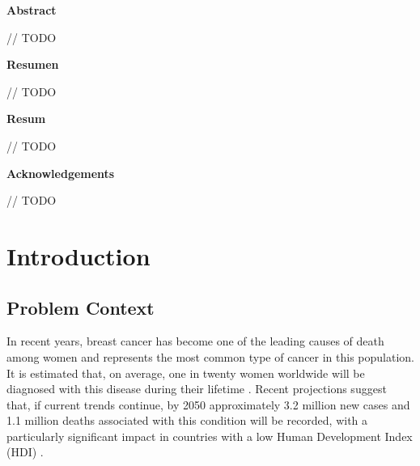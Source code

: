 \documentclass[a4paper,10pt]{book}
\begin{document}
\newpage
{}
\noindent \textbf{\large Abstract}

// TODO


\newpage
{}
\noindent \textbf{\large Resumen}

// TODO


\newpage
{}
\noindent \textbf{\large Resum}

// TODO

\newpage
{}
\noindent \textbf{\large Acknowledgements}

// TODO
 \setcounter{page}{0}
\let\cleardoublepage\clearpage
\tableofcontents
\newpage \thispagestyle{empty}

\pagestyle{fancy}
\newpage \thispagestyle{empty}
\mainmatter
\chapter{Introduction}
\section{Problem Context}

In recent years, breast cancer has become one of the leading causes of death among women and represents the most common type of cancer in this population. It is estimated that, on average, one in twenty women worldwide will be diagnosed with this disease during their lifetime \cite{kim_global_2025}. Recent projections suggest that, if current trends continue, by 2050 approximately 3.2 million new cases and 1.1 million deaths associated with this condition will be recorded, with a particularly significant impact in countries with a low Human Development Index (HDI) \cite{kim_global_2025}.
\end{document}

